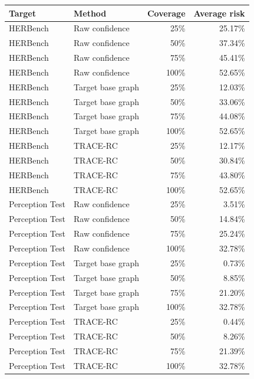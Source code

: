 \begin{tabular}{llrr}
\toprule
Target & Method & Coverage & Average risk \\
\midrule
HERBench & Raw confidence & 25\% & 25.17\% \\
HERBench & Raw confidence & 50\% & 37.34\% \\
HERBench & Raw confidence & 75\% & 45.41\% \\
HERBench & Raw confidence & 100\% & 52.65\% \\
HERBench & Target base graph & 25\% & 12.03\% \\
HERBench & Target base graph & 50\% & 33.06\% \\
HERBench & Target base graph & 75\% & 44.08\% \\
HERBench & Target base graph & 100\% & 52.65\% \\
HERBench & TRACE-RC & 25\% & 12.17\% \\
HERBench & TRACE-RC & 50\% & 30.84\% \\
HERBench & TRACE-RC & 75\% & 43.80\% \\
HERBench & TRACE-RC & 100\% & 52.65\% \\
Perception Test & Raw confidence & 25\% & 3.51\% \\
Perception Test & Raw confidence & 50\% & 14.84\% \\
Perception Test & Raw confidence & 75\% & 25.24\% \\
Perception Test & Raw confidence & 100\% & 32.78\% \\
Perception Test & Target base graph & 25\% & 0.73\% \\
Perception Test & Target base graph & 50\% & 8.85\% \\
Perception Test & Target base graph & 75\% & 21.20\% \\
Perception Test & Target base graph & 100\% & 32.78\% \\
Perception Test & TRACE-RC & 25\% & 0.44\% \\
Perception Test & TRACE-RC & 50\% & 8.26\% \\
Perception Test & TRACE-RC & 75\% & 21.39\% \\
Perception Test & TRACE-RC & 100\% & 32.78\% \\
\bottomrule
\end{tabular}
